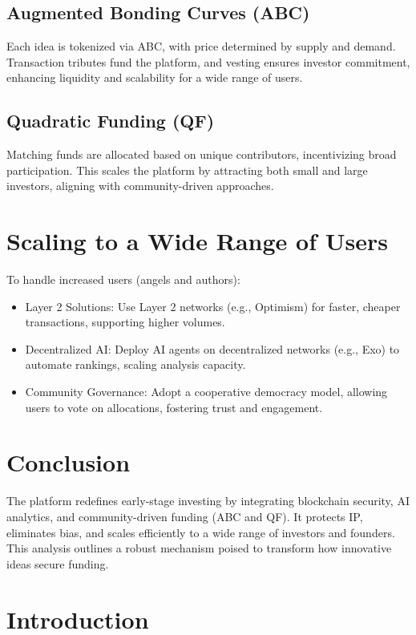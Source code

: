\documentclass[12pt]{article}
\begin{document}
\subsection{Augmented Bonding Curves (ABC)}
Each idea is tokenized via ABC, with price determined by supply and demand. Transaction tributes fund the platform, and vesting ensures investor commitment, enhancing liquidity and scalability for a wide range of users.

\subsection{Quadratic Funding (QF)}
Matching funds are allocated based on unique contributors, incentivizing broad participation. This scales the platform by attracting both small and large investors, aligning with community-driven approaches.

\section{Scaling to a Wide Range of Users}
To handle increased users (angels and authors):
\begin{itemize}
    \item Layer 2 Solutions: Use Layer 2 networks (e.g., Optimism) for faster, cheaper transactions, supporting higher volumes.
    \item Decentralized AI: Deploy AI agents on decentralized networks (e.g., Exo) to automate rankings, scaling analysis capacity.
    \item Community Governance: Adopt a cooperative democracy model, allowing users to vote on allocations, fostering trust and engagement.
\end{itemize}

\section{Conclusion}

The platform redefines early-stage investing by integrating blockchain security, AI analytics, and community-driven funding (ABC and QF). It protects IP, eliminates bias, and scales efficiently to a wide range of investors and founders. This analysis outlines a robust mechanism poised to transform how innovative ideas secure funding.

\section{Introduction}
\end{document}
